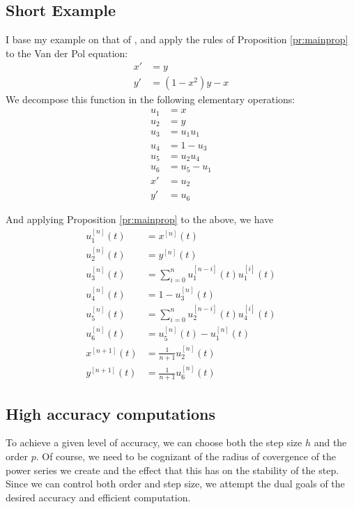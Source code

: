 \documentclass[11pt]{article}
\def\f{\frac }
\begin{document}
\subsection{Short Example}
I base my example on that of \cite{jorba2005software}, and apply the rules of Proposition \ref{pr:mainprop} to the Van der Pol equation:
\begin{align*} x' &= y\\
y' &= (1-x^2)y -x \end{align*}
We decompose this function in the following elementary operations:
\begin{align*}
u_1 &= x\\
u_2 &= y\\
u_3 &= u_1u_1\\
u_4 &= 1 - u_3\\
u_5 &= u_2u_4\\
u_6 &= u_5 - u_1\\
x' &= u_2\\
y' &= u_6\end{align*}

And applying Proposition \ref{pr:mainprop} to the above, we have
\begin{align*}
u_1^{[n]}(t) &= x^{[n]}(t)\\
u_2^{[n]}(t) &= y^{[n]}(t)\\
u_3^{[n]}(t) &= \sum _{i=0} ^n u_1^{[n-i]}(t)u_1^{[i]}(t)\\
u_4^{[n]}(t) &= 1 - u_3^{[n]}(t)\\
u_5^{[n]}(t) &= \sum _{i=0} ^n u_2^{[n-i]}(t)u_4^{[i]}(t)\\
u_6^{[n]}(t) &= u_5^{[n]}(t) - u_1^{[n]}(t)\\
x^{[n+1]}(t) &= \f{1}{n+1}u_2^{[n]}(t)\\
y^{[n+1]}(t) &= \f{1}{n+1}u_6^{[n]}(t)\end{align*}

\subsection{High accuracy computations}

To achieve a given level of accuracy, we can choose both the step size $h$ and the order $p$.
Of course, we need to be cognizant of the radius of covergence of the power series we create and the effect that this has on the stability of the step.
Since we can control both order and step size, we attempt the dual goals of the desired accuracy and efficient computation.
\end{document}
